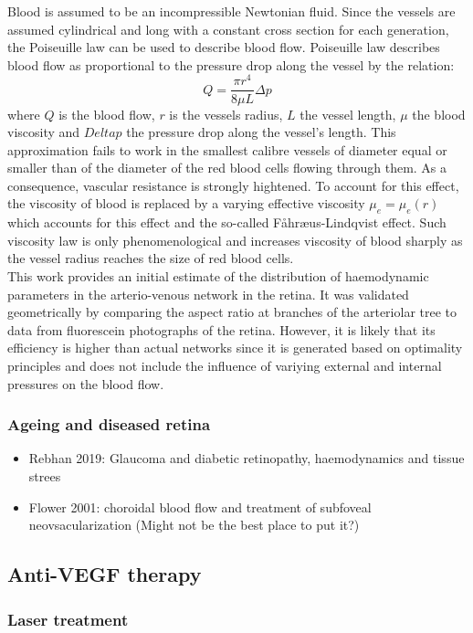 \documentclass[12pt,a4paper]{article}
\begin{document}
Blood is assumed to be an incompressible Newtonian fluid.
Since the vessels are assumed cylindrical and long with a constant cross section for each generation, the Poiseuille law can be used to describe blood flow.
Poiseuille law describes blood flow as proportional to the pressure drop along the vessel by the relation:
\begin{equation}
  \label{eq:PoiseuilleLaw}
  Q = \frac{\pi r^4}{8\mu L}\Delta p
\end{equation}
where $Q$ is the blood flow, $r$ is the vessels radius, $L$ the vessel length, $\mu$ the blood viscosity and $Delta p$ the pressure drop along the vessel's length.
This approximation fails to work in the smallest calibre vessels of diameter equal or smaller than of the diameter of the red blood cells flowing through them.
As a consequence, vascular resistance is strongly hightened.
To account for this effect, the viscosity of blood is replaced by a varying effective viscosity $\mu_e = \mu_e(r)$ which accounts for this effect and the so-called F\r{a}hr\ae us-Lindqvist effect.
Such viscosity law is only phenomenological and increases viscosity of blood sharply as the vessel radius reaches the size of red blood cells.\\
This work provides an initial estimate of the distribution of haemodynamic parameters in the arterio-venous network in the retina.
It was validated geometrically by comparing the aspect ratio at branches of the arteriolar tree to data from fluorescein photographs of the retina. 
However, it is likely that its efficiency is higher than actual networks since it is generated based on optimality principles and does not include the influence of variying external and internal pressures on the blood flow.



\subsubsection{Ageing and diseased retina}
\begin{itemize}
\item Rebhan 2019: Glaucoma and diabetic retinopathy, haemodynamics and tissue strees
\item Flower 2001: choroidal blood flow and treatment of subfoveal neovsacularization (Might not be the best place to put it?)
\end{itemize}

\subsection{Anti-VEGF therapy}
\subsubsection{Laser treatment}
\end{document}
